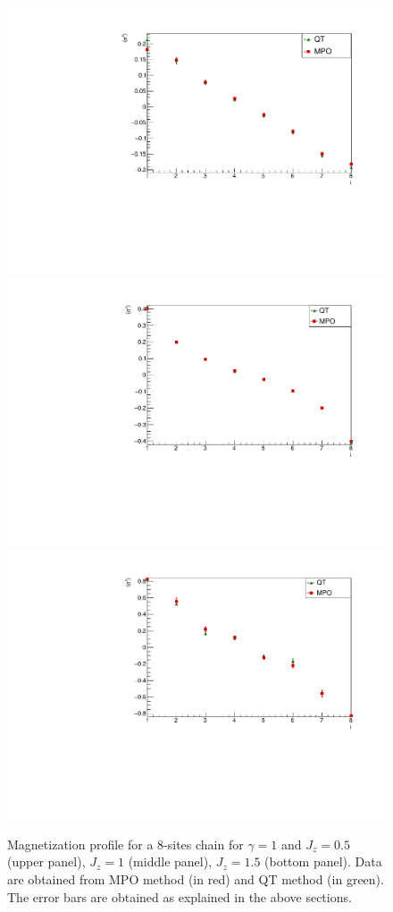 \begin{figure}
    \centering
        \includegraphics[scale=0.5]{Figures/LMComparison_8sJ10505.pdf}
        \includegraphics[scale=0.5]{Figures/LMComparison_8sJ1051.pdf}
        \includegraphics[scale=0.5]{Figures/LMComparison_8sJ10515.pdf}
    \captionsetup{width=1.\linewidth}
    \caption{Magnetization profile for a 8-sites chain for $\gamma = 1$ and $J_z = 0.5$ (upper panel), $J_z = 1$ (middle panel), $J_z = 1.5$ (bottom panel). Data are obtained from MPO method (in red) and QT method (in green). The error bars are obtained as explained in the above sections.}
    \label{fig:LM_comparison_QTvsMPO}
\end{figure}